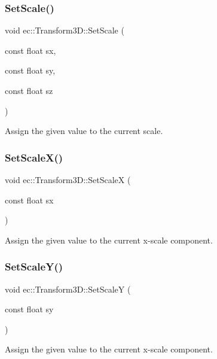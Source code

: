 \subsubsection{\texorpdfstring{Set\+Scale()}{SetScale()}\hspace{0.1cm}{\footnotesize\ttfamily [2/2]}}
{\footnotesize\ttfamily void ec\+::\+Transform3\+D\+::\+Set\+Scale (\begin{DoxyParamCaption}\item[{const float}]{sx,  }\item[{const float}]{sy,  }\item[{const float}]{sz }\end{DoxyParamCaption})}

Assign the given value to the current scale. \mbox{\label{classec_1_1_transform3_d_ae846994da07971f9d56b33d29cd65088}} 
\subsubsection{\texorpdfstring{Set\+Scale\+X()}{SetScaleX()}}
{\footnotesize\ttfamily void ec\+::\+Transform3\+D\+::\+Set\+ScaleX (\begin{DoxyParamCaption}\item[{const float}]{sx }\end{DoxyParamCaption})}

Assign the given value to the current x-\/scale component. \mbox{\label{classec_1_1_transform3_d_a2fc713c7032ef473b7c6cc73e323e54f}} 
\subsubsection{\texorpdfstring{Set\+Scale\+Y()}{SetScaleY()}}
{\footnotesize\ttfamily void ec\+::\+Transform3\+D\+::\+Set\+ScaleY (\begin{DoxyParamCaption}\item[{const float}]{sy }\end{DoxyParamCaption})}

Assign the given value to the current x-\/scale component. \mbox{\label{classec_1_1_transform3_d_a7e6dcd189fb5e4300e63a6eaeb20eece}} 
